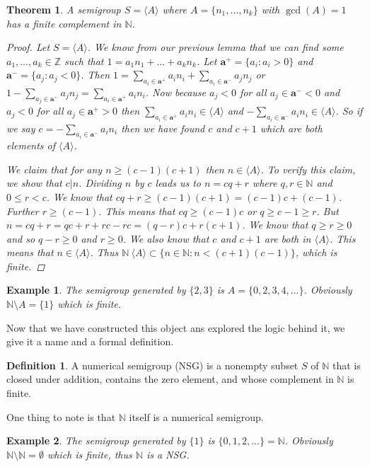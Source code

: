 \documentclass[11pt]{amsart}
\theoremstyle{plain}
\newtheorem{thm}{Theorem}
\newtheorem{exa}{Example}
\theoremstyle{definition}
\newtheorem{defi}{Definition}
\begin{document}
\begin{thm}
A semigroup $S=\langle A\rangle$ where $A=\{n_1,\dots,n_k\}$ with $\gcd(A)=1$ has a finite complement in $\mathbb{N}$.
\begin{proof}
Let $S=\langle A\rangle$.
We know from our previous lemma that we can find some $a_1,\dots,a_k\in \mathbb{Z}$ such that $1=a_1n_1+\dots+a_kn_k$.
Let $\mathbf{a^+}=\{a_i:a_i>0\}$ and $\mathbf{a^-}=\{a_j:a_j<0\}$.
Then $1=\sum\limits_{a_i\in\mathbf{a^+}}{a_in_i}+\sum\limits_{a_i\in\mathbf{a^-}}{a_jn_j}$ or $1-\sum\limits_{a_j\in\mathbf{a^-}}
{a_jn_j}=\sum\limits_{a_i\in\mathbf{a^+}}{a_in_i}$. Now because $a_j<0$ for all
$a_j\in \mathbf{a^-}<0$ and $a_j<0$ for all $a_j\in \mathbf{a^+}>0$ then $\sum\limits_{a_i\in\mathbf{a^+}}
{a_in_i}\in \langle A\rangle $ and $-\sum\limits_{a_i\in\mathbf{a^-}}{a_in_i}\in
\langle A\rangle $. So if we say $c=-\sum\limits_{a_i\in\mathbf{a^-}}{a_in_i}$
then we have found $c$ and $c+1$ which are both elements of $ \langle A\rangle$.

We claim that for any $n\ge (c-1)(c+1)$ then $n\in \langle A\rangle$. To verify
this claim, we show that $c|n$. Dividing $n$ by $c$ leads us to $n=cq+r$ where
$q,r\in \mathbb{N}$ and $0\le r<c$. We know that $cq+r\ge(c-1)(c+1)=(c-1)c+(c-1)$.
Further $r\ge (c-1)$. This means that $cq\ge (c-1)c$ or $q\ge c-1\ge r$. But
$n=cq+r=qc+r+rc-rc=(q-r)c+r(c+1)$. We know that $q\ge r\ge 0$ and so $q-r\ge 0$
and $r\ge 0$. We also know that $c$ and $c+1$ are both in $ \langle A\rangle$.
This means that $n\in \langle A\rangle$. Thus
$\mathbb{N}\ \langle A\rangle\subset \{n\in \mathbb{N}:n<(c+1)(c-1)\}$, which is
finite.

\end{proof}
\end{thm}
\begin{exa}
  The semigroup generated by $\{2,3\}$ is $A=\{0,2,3,4,\dots \}$. Obviously
  $\mathbb{N}\setminus A=\{1\}$ which is finite.
\end{exa}
Now that we have constructed this object ans explored the logic behind it, we give it a name and a formal definition.
\begin{defi}\cite{rosales}
  A numerical semigroup (NSG) is a nonempty subset $S$ of $\mathbb{N}$ that is closed
under addition, contains the zero element, and whose complement in $\mathbb{N}$
is finite.
\end{defi}
One thing to note is that $\mathbb{N}$ itself is a numerical semigroup.
\begin{exa}
  The semigroup generated by $\{1\}$ is $\{0,1,2,\dots \}=\mathbb{N}$. Obviously
  $\mathbb{N}\setminus \mathbb{N}=\emptyset$ which is finite, thus $\mathbb{N}$
  is a NSG.
\end{exa}
\end{document}
